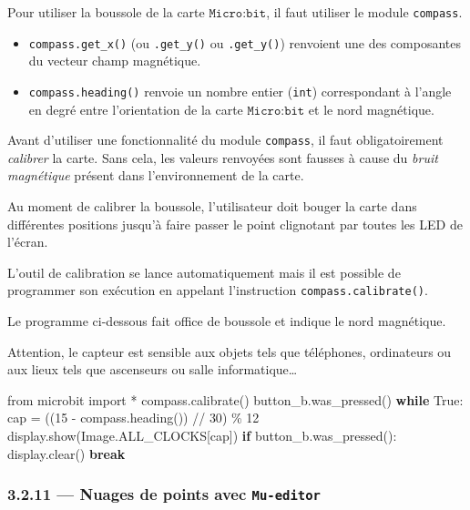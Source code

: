 \documentclass[a4paper,17pt]{extarticle}
\providecommand{\tightlist}{%
      \setlength{\itemsep}{0pt}\setlength{\parskip}{0pt}}
\newenvironment{Shaded}{}{}
\newcommand{\DecValTok}[1]{\textcolor[rgb]{0.25,0.63,0.44}{{#1}}}
\newcommand{\NormalTok}[1]{{#1}}
\newcommand{\ImportTok}[1]{{#1}}
\newcommand{\VariableTok}[1]{\textcolor[rgb]{0.10,0.09,0.49}{{#1}}}
\newcommand{\ControlFlowTok}[1]{\textcolor[rgb]{0.00,0.44,0.13}{\textbf{{#1}}}}
\newcommand{\OperatorTok}[1]{\textcolor[rgb]{0.40,0.40,0.40}{{#1}}}
\begin{document}
Pour utiliser la boussole de la carte \(\texttt{Micro:bit}\), il faut
utiliser le module \texttt{compass}.

\begin{itemize}
\tightlist
\item
  \texttt{compass.get\_x()} (ou \texttt{.get\_y()} ou
  \texttt{.get\_y()}) renvoient une des composantes du vecteur champ
  magnétique.
\item
  \texttt{compass.heading()} renvoie un nombre entier (\texttt{int})
  correspondant à l'angle en degré entre l'orientation de la carte
  \(\texttt{Micro:bit}\) et le nord magnétique.
\end{itemize}
\begin{remarque}
    Avant d'utiliser une fonctionnalité du module \texttt{compass}, il faut
obligatoirement \emph{calibrer} la carte. Sans cela, les valeurs
renvoyées sont fausses à cause du \emph{bruit magnétique} présent dans
l'environnement de la carte.

Au moment de calibrer la boussole, l'utilisateur doit bouger la carte
dans différentes positions jusqu'à faire passer le point clignotant par
toutes les LED de l'écran.

L'outil de calibration se lance automatiquement mais il est possible de
programmer son exécution en appelant l'instruction
\texttt{compass.calibrate()}.

        \end{remarque}\begin{exemple}
    Le programme ci-dessous fait office de boussole et indique le nord
magnétique.

Attention, le capteur est sensible aux objets tels que téléphones,
ordinateurs ou aux lieux tels que ascenseurs ou salle
informatique\ldots{}

\begin{Shaded}
\begin{Highlighting}[]
\ImportTok{from}\NormalTok{ microbit }\ImportTok{import} \OperatorTok{*}
\NormalTok{compass.calibrate()}
\NormalTok{button\_b.was\_pressed()}
\ControlFlowTok{while} \VariableTok{True}\NormalTok{:}
\NormalTok{    cap }\OperatorTok{=}\NormalTok{ ((}\DecValTok{15} \OperatorTok{{-}}\NormalTok{ compass.heading()) }\OperatorTok{//} \DecValTok{30}\NormalTok{) }\OperatorTok{\%} \DecValTok{12}
\NormalTok{    display.show(Image.ALL\_CLOCKS[cap])}
    \ControlFlowTok{if}\NormalTok{ button\_b.was\_pressed():}
\NormalTok{        display.clear()}
        \ControlFlowTok{break}
\end{Highlighting}
\end{Shaded}

        \end{exemple}
    \hypertarget{nuages-de-points-avec-mu-editor}{%
\subsubsection{\texorpdfstring{3.2.11 --- Nuages de points avec
\texttt{Mu-editor}}{3.2.11 --- Nuages de points avec Mu-editor}}\label{nuages-de-points-avec-mu-editor}}
\end{document}
